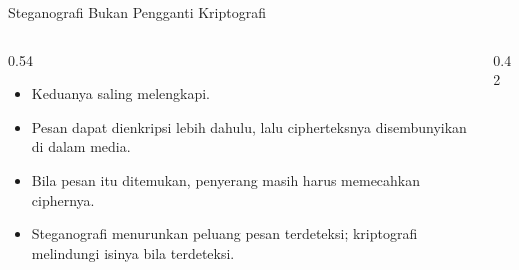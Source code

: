 \documentclass[aspectratio=169,11pt]{beamer}
\begin{document}
\begin{frame}{Steganografi Bukan Pengganti Kriptografi}
    \begin{columns}[T,onlytextwidth]
        \begin{column}{0.54\textwidth}
            \footnotesize
            \begin{itemize}
                \item Keduanya saling melengkapi.
                \item Pesan dapat dienkripsi lebih dahulu, lalu cipherteksnya
                      disembunyikan di dalam media.
                \item Bila pesan itu ditemukan, penyerang masih harus
                      memecahkan ciphernya.
                \item Steganografi menurunkan peluang pesan terdeteksi;
                      kriptografi melindungi isinya bila terdeteksi.
            \end{itemize}
        \end{column}
        \begin{column}{0.42\textwidth}
        \end{column}
    \end{columns}
\end{frame}
\end{document}

